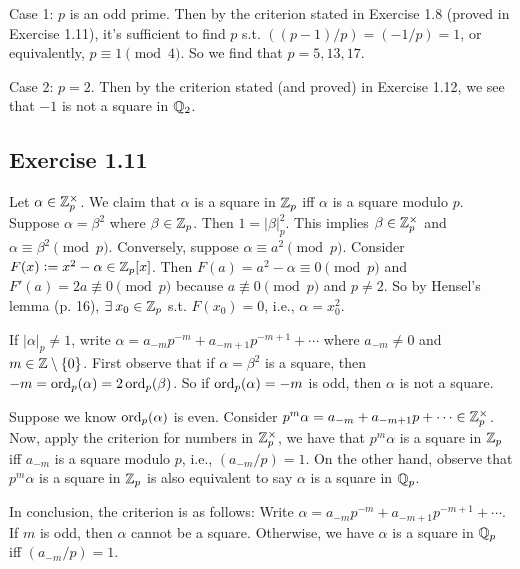 \documentclass[../Koblitz.tex]{subfiles}
\begin{document}
Case 1: $p$ is an odd prime. Then by the criterion stated in Exercise 1.8 (proved in Exercise 1.11), it's sufficient to find $p$ s.t. $((p-1)/p)=(-1/p)=1$, or equivalently, $p\equiv1\pmod{4}$. So we find that $p=5,13,17$.

Case 2: $p=2$. Then by the criterion stated (and proved) in Exercise 1.12, we see that $-1$ is not a square in $\mathbb{Q}_2$.

\subsection*{Exercise 1.11}

Let $\alpha\in\mathbb{Z}_p^\times$. We claim that $\alpha$ is a square in $\mathbb{Z}_p$ iff $\alpha$ is a square modulo $p$. Suppose $\alpha=\beta^2$ where $\beta\in\mathbb{Z}_p$. Then $1=|\beta|_p^2$. This implies $\beta\in\mathbb{Z}_p^\times$ and $\alpha\equiv \beta^2 \pmod{p}$. Conversely, suppose $\alpha\equiv a^2 \pmod{p}$. Consider $F(x):=x^2-\alpha\in\mathbb{Z}_p[x]$. Then $F(a)=a^2-\alpha\equiv0\pmod{p}$ and $F'(a)=2a\not\equiv0 \pmod{p}$ because $a\not\equiv0\pmod{p}$ and $p\neq2$. So by Hensel's lemma (p. 16), $\exists x_0\in\ZZ_p$ s.t. $F(x_0)=0$, i.e., $\alpha=x_0^2$.

If $|\alpha|_p\neq1$, write $\alpha=a_{-m}p^{-m}+a_{-m+1}p^{-m+1}+\cdots$ where $a_{-m}\neq0$ and $m\in\mathbb{Z}\setminus\{0\}$. First observe that if $\alpha=\beta^2$ is a square, then $-m=\operatorname{ord}_p(\alpha)=2\operatorname{ord}_p(\beta)$. So if $\operatorname{ord}_p(\alpha)=-m$ is odd, then $\alpha$ is not a square.

Suppose we know $\operatorname{ord}_p(\alpha)$ is even. Consider $p^m\alpha = a_{-m}+a_{-m+1}p+\cdots\in\mathbb{Z}_p^\times$. Now, apply the criterion for numbers in $\mathbb{Z}_p^\times$, we have that $p^m\alpha$ is a square in $\mathbb{Z}_p$ iff $a_{-m}$ is a square modulo $p$, i.e., $(a_{-m}/p)=1$. On the other hand, observe that $p^m\alpha$ is a square in $\mathbb{Z}_p$ is also equivalent to say $\alpha$ is a square in $\mathbb{Q}_p$.

In conclusion, the criterion is as follows: Write $\alpha=a_{-m}p^{-m}+a_{-m+1}p^{-m+1}+\cdots$. If $m$ is odd, then $\alpha$ cannot be a square. Otherwise, we have $\alpha$ is a square in $\mathbb{Q}_p$ iff $(a_{-m}/p)=1$.
\end{document}
